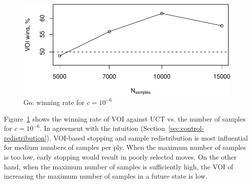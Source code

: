 \documentclass[]{article}
\begin{document}
\begin{figure}[h!]
\centering
\includegraphics[scale=0.6]{voi-wins.pdf}
\caption{Go: winning rate for $c=10^{-6}$}
\label{fig:voi-wins}
\end{figure}

Figure~\ref{fig:voi-wins}
shows the winning rate of VOI against UCT vs. the number of
samples for $c=10^{-6}$. In agreement with the intuition
(Section~\ref{sec:control-redistribution}), VOI-based stopping and
sample redistribution is most influential for medium numbers of
samples per ply. When the maximum number of samples is too low, early
stopping would result in poorly selected moves. On the other hand,
when the maximum number of samples is sufficiently high, the VOI of
increasing the maximum number of samples in a future state is low.



\end{document}
